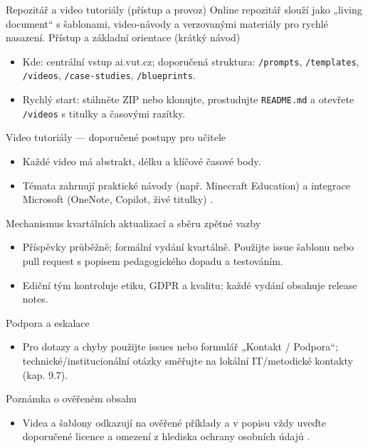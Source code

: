 Repozitář a video tutoriály (přístup a provoz)
Online repozitář slouží jako „living document“ s šablonami, video‑návody a verzovanými materiály pro rychlé nasazení.
Přístup a základní orientace (krátký návod)
\begin{itemize}
\item Kde: centrální vstup ai.vut.cz; doporučená struktura: \texttt{/prompts}, \texttt{/templates}, \texttt{/videos}, \texttt{/case‑studies}, \texttt{/blueprints}.
\item Rychlý start: stáhněte ZIP nebo klonujte, prostudujte \texttt{README.md} a otevřete \texttt{/videos} s titulky a časovými razítky.
\end{itemize}
Video tutoriály — doporučené postupy pro učitele
\begin{itemize}
\item Každé video má abstrakt, délku a klíčové časové body.
\item Témata zahrnují praktické návody (např. Minecraft Education) \cite{kb_ai_101_tipu_pdf_04e4a115_page_15_2} a integrace Microsoft (OneNote, Copilot, živé titulky) \cite{kb_ai_101_tipu_pdf_04e4a115_page_8_1, kb_ai_101_tipu_pdf_04e4a115_page_16_1}.
\end{itemize}
Mechanismus kvartálních aktualizací a sběru zpětné vazby
\begin{itemize}
\item Příspěvky průběžně; formální vydání kvartálně. Použijte issue šablonu nebo pull request s popisem pedagogického dopadu a testováním.
\item Ediční tým kontroluje etiku, GDPR a kvalitu; každé vydání obsahuje release notes.
\end{itemize}
Podpora a eskalace
\begin{itemize}
\item Pro dotazy a chyby použijte issues nebo formulář „Kontakt / Podpora“; technické/institucionální otázky směřujte na lokální IT/metodické kontakty (kap. 9.7).
\end{itemize}
Poznámka o ověřeném obsahu
\begin{itemize}
\item Videa a šablony odkazují na ověřené příklady a v popisu vždy uveďte doporučené licence a omezení z hlediska ochrany osobních údajů \cite{kb_ai_101_tipu_pdf_04e4a115_page_15_2, kb_ai_101_tipu_pdf_04e4a115_page_8_1, kb_ai_101_tipu_pdf_04e4a115_page_16_1}.
\end{itemize}